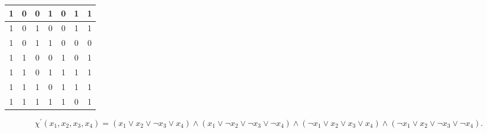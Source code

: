 \begin{example}
\begin{table}[h]
\begin{tabular}{|c|c|c|c|c|c|c|}
        1     & 0     & 0     & 1     & 0             & 1                                                 & 1                                    \\ \hline
        1     & 0     & 1     & 0     & 0             & 1                                                 & 1                                    \\ \hline
        1     & 0     & 1     & 1     & 0             & 0                                                 & 0                                    \\ \hline
        1     & 1     & 0     & 0     & 1             & 0                                                 & 1                                    \\ \hline
        1     & 1     & 0     & 1     & 1             & 1                                                 & 1                                    \\ \hline
        1     & 1     & 1     & 0     & 1             & 1                                                 & 1                                    \\ \hline
        1     & 1     & 1     & 1     & 1             & 0                                                 & 1                                    \\ \hline
        \end{tabular}
    \end{table}
    \[\chi^\prime(x_1,x_2,x_3,x_4)=(x_1\lor x_2\lor \neg x_3\lor x_4)\land(x_1\lor\neg x_2\lor\neg x_3\lor\neg x_4)\land(\neg x_1\lor x_2\lor x_3\lor x_4)\land(\neg x_1\lor x_2\lor \neg x_3\lor\neg x_4).\]
\end{example}
